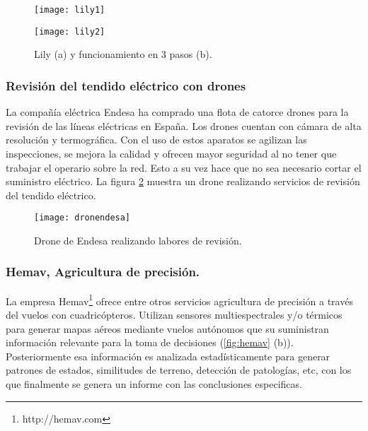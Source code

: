 \begin{figure}[htb]
\centering
\texttt{[image: lily1]}
\end{figure}

\begin{figure}[htb]
\centering
\texttt{[image: lily2]}
\caption{Lily (a) y funcionamiento en 3 pasos (b).}
\label{fig:lily}
\end{figure}

\subsubsection{Revisión del tendido eléctrico con drones}

La compañía eléctrica Endesa ha comprado una flota de catorce drones para la revisión de las líneas eléctricas en España. Los drones cuentan con cámara de alta resolución y termográfica. Con el uso de estos aparatos se agilizan las inspecciones, se mejora la calidad y ofrecen mayor seguridad al no tener que trabajar el operario sobre la red. Esto a su vez hace que no sea necesario cortar el suministro eléctrico. La figura \ref{fig:droneendesa} muestra un drone realizando servicios de revisión del tendido eléctrico.\\

\begin{figure}[h!]
\centering
\texttt{[image: dronendesa]}
\caption{Drone de Endesa realizando labores de revisión.}
\label{fig:droneendesa}
\end{figure}


\subsubsection{Hemav, Agricultura de precisión.}

La empresa Hemav\footnote{http://hemav.com} ofrece entre otros servicios agricultura de precisión a través del vuelos con cuadricópteros. Utilizan sensores multiespectrales y/o térmicos para generar mapas aéreos mediante vuelos autónomos que su suministran información relevante para la toma de decisiones (\ref{fig:hemav} (b)).\\

Posteriormente esa información es analizada estadísticamente para generar patrones de estados, similitudes de terreno, detección de patologías, etc, con los que finalmente se genera un informe con las conclusiones especificas.\\

